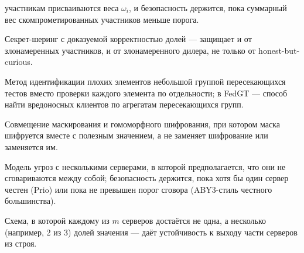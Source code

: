 \documentclass[11pt]{article}
\begin{document}
\begin{description}
    участникам присваиваются веса $\omega_i$, и безопасность держится, пока
    суммарный вес скомпрометированных участников меньше порога.
  \item[Verifiable Secret Sharing (VSS)] Секрет-шеринг с доказуемой корректностью
    долей — защищает и от злонамеренных участников, и от злонамеренного дилера, не
    только от honest-but-curious.
  \item[Group testing] Метод идентификации \guillemotleft плохих\guillemotright{}
    элементов небольшой группой пересекающихся тестов вместо проверки каждого
    элемента по отдельности; в FedGT — способ найти вредоносных клиентов по
    агрегатам пересекающихся групп.
  \item[Key-homomorphic masking] Совмещение маскирования и гомоморфного шифрования,
    при котором маска шифруется вместе с полезным значением, а не заменяет
    шифрование или заменяется им.
  \item[Non-colluding servers] Модель угроз с несколькими серверами, в которой
    предполагается, что они не сговариваются между собой; безопасность держится,
    пока хотя бы один сервер честен (Prio) или пока не превышен порог сговора
    (ABY3-стиль честного большинства).
  \item[Replicated secret sharing] Схема, в которой каждому из $m$ серверов
    достаётся не одна, а несколько (например, 2 из 3) долей значения — даёт
    устойчивость к выходу части серверов из строя.
\end{description}
\end{document}
